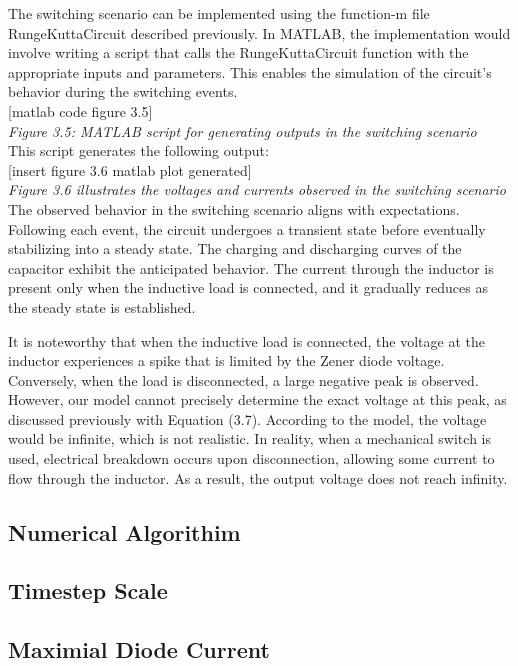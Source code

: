 The switching scenario can be implemented using the function-m file RungeKuttaCircuit described previously. In MATLAB, the implementation would involve writing a script that calls the RungeKuttaCircuit function with the appropriate inputs and parameters. This enables the simulation of the circuit's behavior during the switching events.\\

[matlab code figure 3.5]\\

\emph{Figure 3.5: MATLAB script for generating outputs in the switching scenario}\\

This script generates the following output:\\

[insert figure 3.6 matlab plot generated]\\

\emph{Figure 3.6 illustrates the voltages and currents observed in the switching scenario}\\

The observed behavior in the switching scenario aligns with expectations. Following each event, the circuit undergoes a transient state before eventually stabilizing into a steady state. The charging and discharging curves of the capacitor exhibit the anticipated behavior. The current through the inductor is present only when the inductive load is connected, and it gradually reduces as the steady state is established.

It is noteworthy that when the inductive load is connected, the voltage at the inductor experiences a spike that is limited by the Zener diode voltage. Conversely, when the load is disconnected, a large negative peak is observed. However, our model cannot precisely determine the exact voltage at this peak, as discussed previously with Equation (3.7). According to the model, the voltage would be infinite, which is not realistic. In reality, when a mechanical switch is used, electrical breakdown occurs upon disconnection, allowing some current to flow through the inductor. As a result, the output voltage does not reach infinity.\\






























\subsection{Numerical Algorithim}
\subsection{Timestep Scale}
\subsection{Maximial Diode Current}